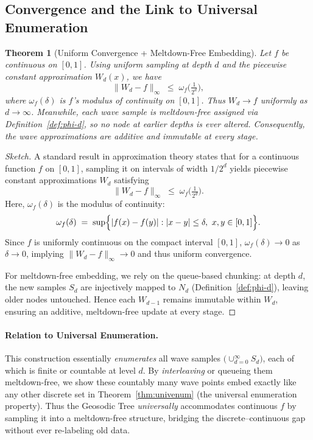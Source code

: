 \documentclass[acmsmall]{acmart}
\newtheorem{theorem}{Theorem}
\theoremstyle{definition}
\theoremstyle{remark}
\begin{document}
\subsection{Convergence and the Link to Universal Enumeration}
\label{subsec:wave-conclusion}

\begin{theorem}[Uniform Convergence + Meltdown-Free Embedding]
\label{thm:uniform-wave-conv}
  Let $f$ be continuous on $[0,1]$. Using uniform sampling at depth $d$
  and the piecewise constant approximation $W_d(x)$, we have
  \[
    \|W_d - f\|_\infty \;\le\; \omega_f\bigl(\tfrac{1}{2^d}\bigr),
  \]
  where $\omega_f(\delta)$ is $f$'s modulus of continuity on $[0,1]$. Thus
  $W_d \to f$ uniformly as $d\to\infty$. Meanwhile, each wave sample is
  meltdown-free assigned via Definition~\ref{def:phi-d}, so no node at earlier
  depths is ever altered. Consequently, the wave approximations are
  \emph{additive} and \emph{immutable} at every stage.
\end{theorem}

\begin{proof}[Sketch]
  A standard result in approximation theory states that for a continuous
  function $f$ on $[0,1]$, sampling it on intervals of width $1/2^d$ yields
  piecewise constant approximations $W_d$ satisfying
  \[
    \|W_d - f\|_\infty \;\le\; \omega_f\bigl(\tfrac{1}{2^d}\bigr).
  \]
  Here, $\omega_f(\delta)$ is the modulus of continuity:
  \[
    \omega_f(\delta)
    \;=\;
    \sup\Bigl\{
      |f(x)-f(y)| : |x-y|\le\delta,\ x,y\in[0,1]
    \Bigr\}.
  \]
  Since $f$ is uniformly continuous on the compact interval $[0,1]$,
  $\omega_f(\delta)\to 0$ as $\delta\to 0$, implying $\|W_d - f\|_\infty\to0$
  and thus uniform convergence. 

  For meltdown-free embedding, we rely on the queue-based chunking:
  at depth $d$, the new samples $S_d$ are injectively mapped to $N_d$
  (Definition~\ref{def:phi-d}), leaving older nodes untouched. Hence
  each $W_{d-1}$ remains immutable within $W_d$, ensuring an additive,
  meltdown-free update at every stage.
\end{proof}

\paragraph{Relation to Universal Enumeration.}
This construction essentially \emph{enumerates} all wave samples
$\bigl(\cup_{d=0}^{\infty} S_d\bigr)$, each of which is finite or countable at
level $d$. By \emph{interleaving} or queueing them meltdown-free, we show these
countably many wave points embed exactly like any other discrete set in
Theorem~\ref{thm:univenum} (the universal enumeration property). Thus the
Geosodic Tree \emph{universally} accommodates continuous $f$ by sampling it
into a meltdown-free structure, bridging the discrete--continuous gap without
ever re-labeling old data.
\end{document}
